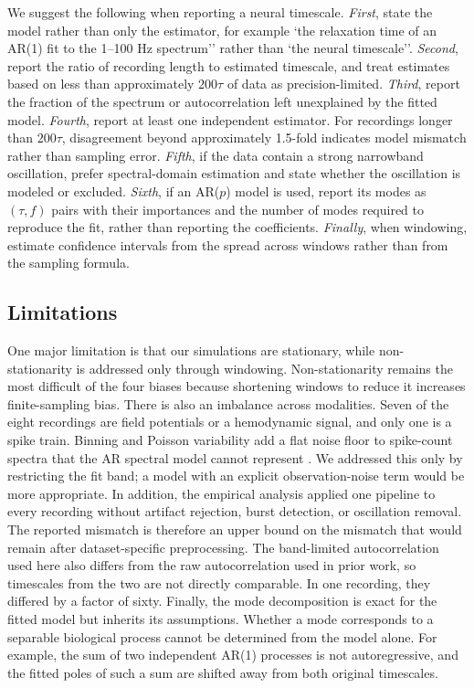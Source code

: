 \documentclass[pdflatex,sn-mathphys-num]{sn-jnl}
\begin{document}
We suggest the following when reporting a neural timescale. \textit{First}, state the model rather than only the estimator, for example `the relaxation time of an AR(1) fit to the 1--100 Hz spectrum'' rather than `the neural timescale''. \textit{Second}, report the ratio of recording length to estimated timescale, and treat estimates based on less than approximately $200\tau$ of data as precision-limited. \textit{Third}, report the fraction of the spectrum or autocorrelation left unexplained by the fitted model. \textit{Fourth}, report at least one independent estimator. For recordings longer than $200\tau$, disagreement beyond approximately 1.5-fold indicates model mismatch rather than sampling error. \textit{Fifth}, if the data contain a strong narrowband oscillation, prefer spectral-domain estimation and state whether the oscillation is modeled or excluded. \textit{Sixth}, if an AR($p$) model is used, report its modes as $(\tau, f)$ pairs with their importances and the number of modes required to reproduce the fit, rather than reporting the coefficients. \textit{Finally}, when windowing, estimate confidence intervals from the spread across windows rather than from the sampling formula.

\subsection{Limitations}

One major limitation is that our simulations are stationary, while non-stationarity is addressed only through windowing. Non-stationarity remains the most difficult of the four biases because shortening windows to reduce it increases finite-sampling bias. There is also an imbalance across modalities. Seven of the eight recordings are field potentials or a hemodynamic signal, and only one is a spike train. Binning and Poisson variability add a flat noise floor to spike-count spectra that the AR spectral model cannot represent \cite{zeraati_flexible_2022, meyer_inferring_2019}. We addressed this only by restricting the fit band; a model with an explicit observation-noise term would be more appropriate. In addition, the empirical analysis applied one pipeline to every recording without artifact rejection, burst detection, or oscillation removal. The reported mismatch is therefore an upper bound on the mismatch that would remain after dataset-specific preprocessing. The band-limited autocorrelation used here also differs from the raw autocorrelation used in prior work, so timescales from the two are not directly comparable. In one recording, they differed by a factor of sixty. Finally, the mode decomposition is exact for the fitted model but inherits its assumptions. Whether a mode corresponds to a separable biological process cannot be determined from the model alone. For example, the sum of two independent AR(1) processes is not autoregressive, and the fitted poles of such a sum are shifted away from both original timescales.
\end{document}
